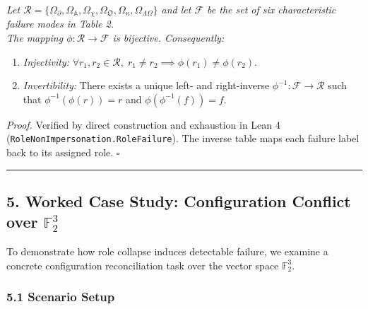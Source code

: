 \documentclass[
  10pt,
]{article}
\begin{document}
\emph{Let \hypertarget{math-E0029-0031}{}{\(\mathcal{R} = \{\Omega_{\partial}, \Omega_{\mathbb{A}}, \Omega_{\chi}, \Omega_{\mathfrak{O}}, \Omega_{\kappa}, \Omega_{\Lambda\Omega}\}\)} and let \hypertarget{math-E0030-0032}{}{\(\mathcal{F}\)} be the set of six characteristic failure modes in Table 2.}\\
\emph{The mapping \hypertarget{math-E0031-0033}{}{\(\phi : \mathcal{R} \to \mathcal{F}\)} is bijective. Consequently:}

\begin{enumerate}
\def\labelenumi{\arabic{enumi}.}
\item
  \emph{Injectivity:} \hypertarget{math-E0032-0034}{}{\(\forall r_1, r_2 \in \mathcal{R},\; r_1 \neq r_2 \implies \phi(r_1) \neq \phi(r_2)\)}.
\item
  \emph{Invertibility:} There exists a unique left- and right-inverse \hypertarget{math-E0033-0035}{}{\(\phi^{-1} : \mathcal{F} \to \mathcal{R}\)} such that \hypertarget{math-E0034-0036}{}{\(\phi^{-1}(\phi(r)) = r\)} and \hypertarget{math-E0035-0037}{}{\(\phi(\phi^{-1}(f)) = f\)}.
\end{enumerate}

\emph{Proof.} Verified by direct construction and exhaustion in Lean 4 (\texttt{RoleNonImpersonation.RoleFailure}). The inverse table maps each failure label back to its assigned role. \hypertarget{math-E0036-0038}{}{\(\square\)}

\begin{center}\rule{0.5\linewidth}{0.5pt}\end{center}

\subsection[5. Worked Case Study: Configuration Conflict over ]{\texorpdfstring{5. Worked Case Study: Configuration Conflict over \protect\hypertarget{math-E0037-0039}{}{\(\mathbb{F}_2^3\)}}{5. Worked Case Study: Configuration Conflict over \textbackslash mathbb\{F\}\_2\^{}3}}\label{worked-case-study-configuration-conflict-over-mathbbf_23}

To demonstrate how role collapse induces detectable failure, we examine a concrete configuration reconciliation task over the vector space \hypertarget{math-E0037-0040}{}{\(\mathbb{F}_2^3\)}.

\subsubsection{5.1 Scenario Setup}\label{scenario-setup}
\end{document}
